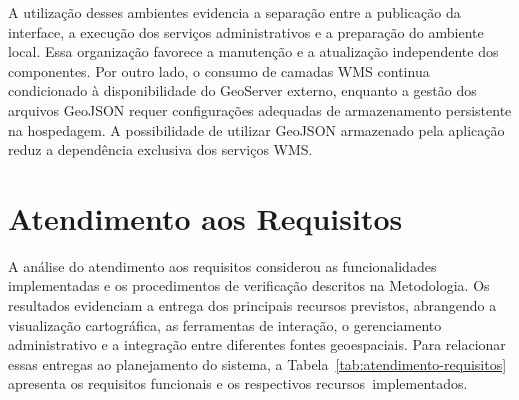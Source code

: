A utilização desses ambientes evidencia a separação entre a publicação da interface, a execução dos serviços administrativos e a preparação do ambiente local. Essa organização favorece a manutenção e a atualização independente dos componentes. Por outro lado, o consumo de camadas WMS continua condicionado à disponibilidade do GeoServer externo, enquanto a gestão dos arquivos GeoJSON requer configurações adequadas de armazenamento persistente na hospedagem. A possibilidade de utilizar GeoJSON armazenado pela aplicação reduz a dependência exclusiva dos serviços WMS.

\FloatBarrier
\section{Atendimento aos Requisitos}
\label{sec:atendimento-requisitos}

A análise do atendimento aos requisitos considerou as funcionalidades implementadas e os procedimentos de verificação descritos na Metodologia. Os resultados evidenciam a entrega dos principais recursos previstos, abrangendo a visualização cartográfica, as ferramentas de interação, o gerenciamento administrativo e a integração entre diferentes fontes geoespaciais. Para relacionar essas entregas ao planejamento do sistema, a Tabela~\ref{tab:atendimento-requisitos} apresenta os requisitos funcionais e os respectivos recursos~implementados.

